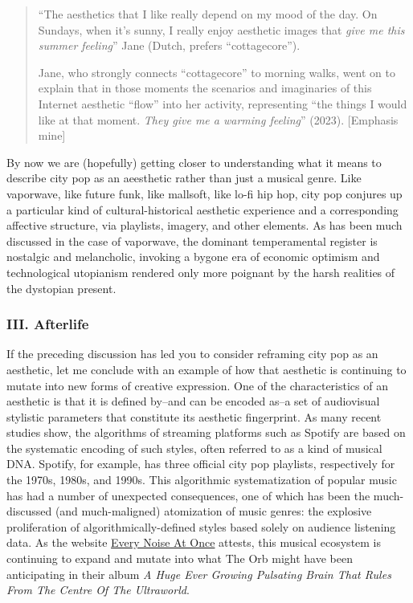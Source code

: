 \documentclass[
  letterpaper,
  DIV=11,
  numbers=noendperiod,
  oneside]{scrartcl}
\begin{document}
\begin{quote}
``The aesthetics that I like really depend on my mood of the day. On
Sundays, when it's sunny, I really enjoy aesthetic images that
\emph{give me this summer feeling}'' Jane (Dutch, prefers
``cottagecore'').

Jane, who strongly connects ``cottagecore'' to morning walks, went on to
explain that in those moments the scenarios and imaginaries of this
Internet aesthetic ``flow'' into her activity, representing ``the things
I would like at that moment. \emph{They give me a warming feeling}''
(2023). {[}Emphasis mine{]}
\end{quote}

By now we are (hopefully) getting closer to understanding what it means
to describe city pop as an aeesthetic rather than just a musical genre.
Like vaporwave, like future funk, like mallsoft, like lo-fi hip hop,
city pop conjures up a particular kind of cultural-historical aesthetic
experience and a corresponding affective structure, via playlists,
imagery, and other elements. As has been much discussed in the case of
vaporwave, the dominant temperamental register is nostalgic and
melancholic, invoking a bygone era of economic optimism and
technological utopianism rendered only more poignant by the harsh
realities of the dystopian present.

\subsubsection{III. Afterlife}\label{iii.-afterlife}

If the preceding discussion has led you to consider reframing city pop
as an aesthetic, let me conclude with an example of how that aesthetic
is continuing to mutate into new forms of creative expression. One of
the characteristics of an aesthetic is that it is defined by--and can be
encoded as--a set of audiovisual stylistic parameters that constitute
its aesthetic fingerprint. As many recent studies show, the algorithms
of streaming platforms such as Spotify are based on the systematic
encoding of such styles, often referred to as a kind of musical DNA.
Spotify, for example, has three official city pop playlists,
respectively for the 1970s, 1980s, and 1990s. This algorithmic
systematization of popular music has had a number of unexpected
consequences, one of which has been the much-discussed (and
much-maligned) atomization of music genres: the explosive proliferation
of algorithmically-defined styles based solely on audience listening
data. As the website \href{https://everynoise.com/engenremap.html}{Every
Noise At Once} attests, this musical ecosystem is continuing to expand
and mutate into what The Orb might have been anticipating in their album
\emph{A Huge Ever Growing Pulsating Brain That Rules From The Centre Of
The Ultraworld}.
\end{document}
